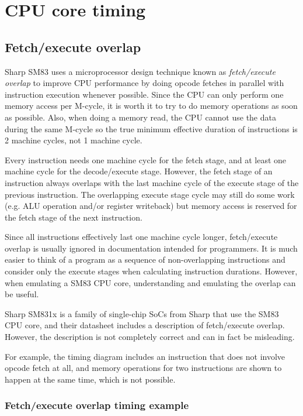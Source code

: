 \documentclass[\main/gbctr.tex]{subfiles}
\begin{document}
\chapter{CPU core timing}

\section{Fetch/execute overlap}

Sharp SM83 uses a microprocessor design technique known as \emph{fetch/execute
overlap} to improve CPU performance by doing opcode fetches in parallel with
instruction execution whenever possible. Since the CPU can only perform one
memory access per M-cycle, it is worth it to try to do memory operations as
soon as possible. Also, when doing a memory read, the CPU cannot use the data
during the same M-cycle so the true minimum effective duration of instructions
is 2 machine cycles, not 1 machine cycle.

Every instruction needs one machine cycle for the fetch stage, and at least one
machine cycle for the decode/execute stage. However, the fetch stage of an
instruction always overlaps with the last machine cycle of the execute stage of
the previous instruction. The overlapping execute stage cycle may still do some
work (e.g. ALU operation and/or register writeback) but memory access is
reserved for the fetch stage of the next instruction.

Since all instructions effectively last one machine cycle longer, fetch/execute
overlap is usually ignored in documentation intended for programmers. It is
much easier to think of a program as a sequence of non-overlapping instructions
and consider only the execute stages when calculating instruction durations.
However, when emulating a SM83 CPU core, understanding and emulating the
overlap can be useful.

\begin{warning}
  Sharp SM831x is a family of single-chip SoCs from Sharp that use the SM83 CPU
  core, and their datasheet \cite{sm831x} includes a description of
  fetch/execute overlap. However, the description is not completely correct and
  can in fact be misleading.

  For example, the timing diagram includes an instruction that does not involve
  opcode fetch at all, and memory operations for two instructions are shown to
  happen at the same time, which is not possible.
\end{warning}

\subsection{Fetch/execute overlap timing example}
\end{document}
